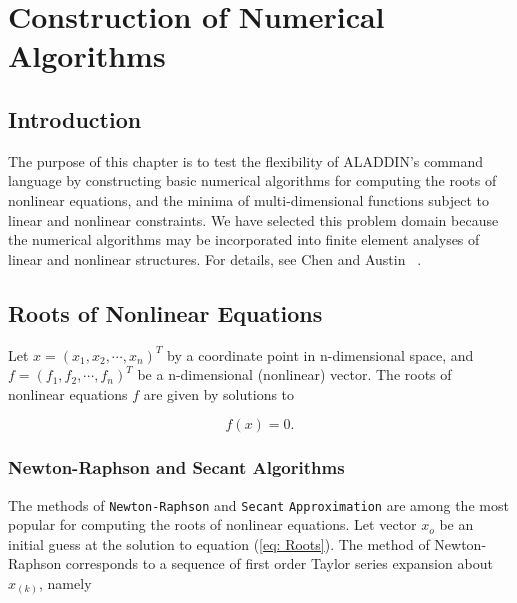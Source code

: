 
\chapter{Construction of Numerical Algorithms}

\section{Introduction}

\vspace{0.15 in}
\noindent\hspace{0.5 in}
The purpose of this chapter is to test the flexibility of ALADDIN's
command language by constructing basic numerical algorithms for
computing the roots of nonlinear equations, and the minima of
multi-dimensional functions subject to linear and nonlinear constraints.
We have selected this problem domain because the numerical algorithms
may be incorporated into finite element analyses of linear and nonlinear structures.
For details, see Chen and Austin ~\cite{chen95}.

\section{Roots of Nonlinear Equations}

\vspace{0.15 in}
\noindent\hspace{0.5 in}
Let $x = (x_1, x_2, \cdots, x_n)^T$ by a coordinate point in n-dimensional space,
and $ f = (f_1, f_2, \cdots, f_n)^T$ be a n-dimensional (nonlinear) vector.
The roots of nonlinear equations $f$ are given by solutions to

\begin{equation}
f(x) = 0.
\label{eq: Roots}
\end{equation}

\subsection{Newton-Raphson and Secant Algorithms}

\vspace{0.15 in}
\noindent\hspace{0.5 in}
The methods of {\tt Newton-Raphson} and {\tt Secant} {\tt Approximation} are among
the most popular for computing the roots of nonlinear equations.
Let vector $x_o$ be an initial guess at the solution to equation (\ref{eq: Roots}).
The method of Newton-Raphson corresponds to a sequence of
first order Taylor series expansion about $x_{(k)}$, namely
 
